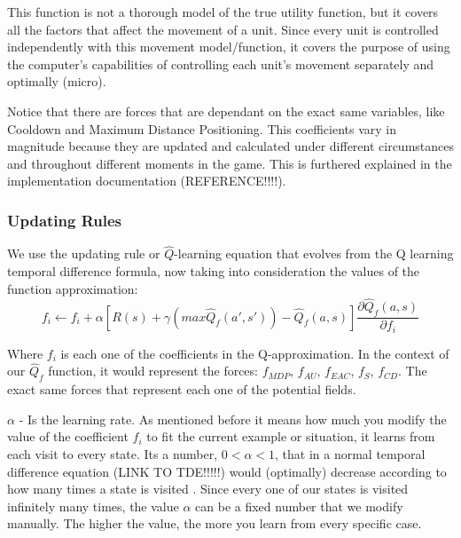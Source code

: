 This function is not a thorough model of the true utility function, but it covers all the factors that affect the movement of a unit. Since every unit is controlled independently with this movement model/function, it covers the purpose of using the computer's capabilities of controlling each unit's movement separately and optimally (micro).

Notice that there are forces that are dependant on the exact same variables, like Cooldown and Maximum Distance Positioning. This coefficients vary in magnitude because they are updated and calculated under different circumstances and throughout different moments in the game. This is furthered explained in the implementation documentation (REFERENCE!!!!). 


\subsubsection{Updating Rules}

We use the updating rule or $\hat{Q}$-learning equation that evolves from the Q learning temporal difference formula, now taking into consideration the values of the function approximation:  \cite{rl} \\ 
 
\begin{equation}
f_i \leftarrow f_i + \alpha [ R(s) + \gamma(max\hat{Q}_f(a',s'))-\hat{Q}_f(a,s) ] \frac{\partial \hat{Q}_f(a,s)}{\partial f_i}
\end{equation}

\begin{flushleft}
Where $f_i$ is each one of the coefficients in the Q-approximation. In the context of our  $\hat{Q}_f$ function, it would represent the forces: $f_{MDP}$, $f_{AU}$, $f_{EAC}$, $f_{S}$, $f_{CD}$. The exact same forces that represent each one of the potential fields.  
\end{flushleft} 

\begin{flushleft}
$\alpha$  - Is the learning rate. As mentioned before it means how much you modify the value of the coefficient $f_i$ to fit the current example or situation, it learns from each visit to every state. Its a number, $0 < \alpha < 1$, that in a normal temporal difference equation (LINK TO TDE!!!!!) would (optimally) decrease according to how many times a state is visited \cite{rl}. Since every one of our states is visited infinitely many times, the value $\alpha$ can be a fixed number that we modify manually. The higher the value, the more you learn from every specific case.
\end{flushleft} 

